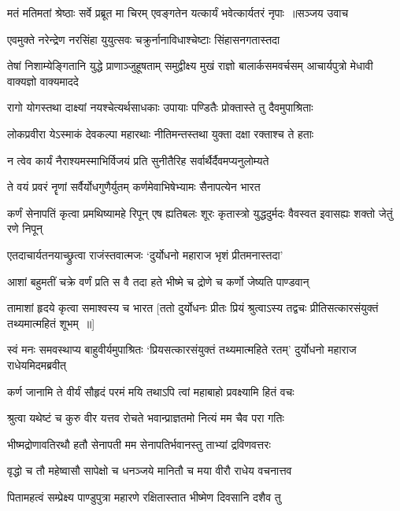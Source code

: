 \threelineshloka
{मतं मतिमतां श्रेष्ठाः सर्वे प्रब्रूत मा चिरम्}
{एवङ्गतेन यत्कार्यं भवेत्कार्यतरं नृपाः ॥सञ्जय उवाच}
{}


\twolineshloka
{एवमुक्ते नरेन्द्रेण नरसिंहा युयुत्सवः}
{चक्रुर्नानाविधाश्चेष्टाः सिंहासनगतास्तदा}


\threelineshloka
{तेषां निशाम्येङ्गितानि युद्धे प्राणाञ्जुहूषताम्}
{समुद्वीक्ष्य मुखं राज्ञो बालार्कसमवर्चसम्}
{आचार्यपुत्रो मेधावी वाक्यज्ञो वाक्यमाददे}


\twolineshloka
{रागो योगस्तथा दाक्ष्यां नयश्चेत्यर्थसाधकाः}
{उपायाः पण्डितैः प्रोक्तास्ते तु दैवमुपाश्रिताः}


\twolineshloka
{लोकप्रवीरा येऽस्माकं देवकल्पा महारथाः}
{नीतिमन्तस्तथा युक्ता दक्षा रक्ताश्च ते हताः}


\twolineshloka
{न त्वेव कार्यं नैराश्यमस्माभिर्विजयं प्रति}
{सुनीतैरिह सर्वार्थैर्दैवमप्यनुलोम्यते}


\twolineshloka
{ते वयं प्रवरं नॄणां सर्वैर्योधगुणैर्युतम्}
{कर्णमेवाभिषेभ्यामः सैनापत्येन भारत}


कर्णं सेनापतिं कृत्वा प्रमथिष्यामहे रिपून्
\twolineshloka
{एष ह्यतिबलः शूरः कृतास्त्रो युद्धदुर्मदः}
{वैवस्वत इवासह्यः शक्तो जेतुं रणे निपून्}


\twolineshloka
{एतदाचार्यतनयाच्छ्रुत्वा राजंस्तवात्मजः}
{`दुर्योधनो महाराज भृशं प्रीतमनास्तदा'}


\twolineshloka
{आशां बहुमतीं चक्रे वर्णं प्रति स वै तदा}
{हते भीष्मे च द्रोणे च कर्णो जेष्यति पाण्डवान्}


\threelineshloka
{तामाशां हृदये कृत्वा समाश्वस्य च भारत}
{[ततो दुर्योधनः प्रीतः प्रियं श्रुत्वाऽस्य तद्वचः}
{प्रीतिसत्कारसंयुक्तं तथ्यमात्महितं शूभम् ॥]}


स्वं मनः समवस्थाप्य बाहुवीर्यमुपाश्रितः
\twolineshloka
{`प्रियसत्कारसंयुक्तं तथ्यमात्महिते रतम्'}
{दुर्योधनो महाराज राधेयमिदमब्रवीत्}


\twolineshloka
{कर्ण जानामि ते वीर्यं सौहृदं परमं मयि}
{तथाऽपि त्वां महाबाहो प्रवक्ष्यामि हितं वचः}


\twolineshloka
{श्रुत्वा यथेष्टं च कुरु वीर यत्तव रोचते}
{भवान्प्राज्ञतमो नित्यं मम चैव परा गतिः}


\twolineshloka
{भीष्मद्रोणावतिरथौ हतौ सेनापती मम}
{सेनापतिर्भवानस्तु ताभ्यां द्रविणवत्तरः}


\twolineshloka
{वृद्धो च तौ महेष्वासौ सापेक्षो च धनञ्जये}
{मानितौ च मया वीरौ राधेय वचनात्तव}


\twolineshloka
{पितामहत्वं सम्प्रेक्ष्य पाण्डुपुत्रा महारणे}
{रक्षितास्तात भीष्मेण दिवसानि दशैव तु}


